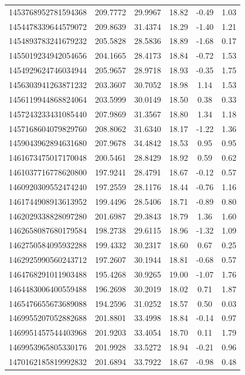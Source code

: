 \begin{longtable}{c c c c c c}
1453768952781594368 & 209.7772 & 29.9967 & 18.82 & -0.49 & 1.03 \\
1454478339644579072 & 209.8639 & 31.4374 & 18.29 & -1.40 & 1.21 \\
1454893783241679232 & 205.5828 & 28.5836 & 18.89 & -1.68 & 0.17 \\
1455019234942054656 & 204.1665 & 28.4173 & 18.84 & -0.72 & 1.53 \\
1454929624746034944 & 205.9657 & 28.9718 & 18.93 & -0.35 & 1.75 \\
1456303941263871232 & 203.3607 & 30.7052 & 18.98 & 1.14 & 1.53 \\
1456119944868824064 & 203.5999 & 30.0149 & 18.50 & 0.38 & 0.33 \\
1457243233431085440 & 207.9869 & 31.3567 & 18.80 & 1.34 & 1.18 \\
1457168604079829760 & 208.8062 & 31.6340 & 18.17 & -1.22 & 1.36 \\
1459043962894631680 & 207.9678 & 34.4842 & 18.53 & 0.95 & 0.95 \\
1461673475017170048 & 200.5461 & 28.8429 & 18.92 & 0.59 & 0.62 \\
1461037716778620800 & 197.9241 & 28.4791 & 18.67 & -0.12 & 0.57 \\
1460920309552474240 & 197.2559 & 28.1176 & 18.44 & -0.76 & 1.16 \\
1461744908913613952 & 199.4496 & 28.5406 & 18.71 & -0.89 & 0.80 \\
1462029338828097280 & 201.6987 & 29.3843 & 18.79 & 1.36 & 1.60 \\
1462658087680179584 & 198.2738 & 29.6115 & 18.96 & -1.32 & 1.09 \\
1462750584095932288 & 199.4332 & 30.2317 & 18.60 & 0.67 & 0.25 \\
1462925990560243712 & 197.2607 & 30.1944 & 18.81 & -0.68 & 0.57 \\
1464768291011903488 & 195.4268 & 30.9265 & 19.00 & -1.07 & 1.76 \\
1464483006400559488 & 196.2698 & 30.2019 & 18.02 & 0.71 & 1.87 \\
1465476655673689088 & 194.2596 & 31.0252 & 18.57 & 0.50 & 0.03 \\
1469955207052882688 & 201.8801 & 33.4998 & 18.84 & -0.14 & 0.97 \\
1469951457544403968 & 201.9203 & 33.4054 & 18.70 & 0.11 & 1.79 \\
1469953965805330176 & 201.9928 & 33.5272 & 18.94 & -0.21 & 0.96 \\
1470162185819992832 & 201.6894 & 33.7922 & 18.67 & -0.98 & 0.48 \\

\end{longtable}
